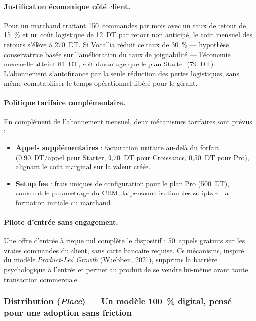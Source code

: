 \paragraph{Justification économique côté client.}
Pour un marchand traitant 150~commandes par mois avec un taux de retour de 15~\%
et un coût logistique de 12~DT par retour non anticipé, le coût mensuel
des retours s'élève à 270~DT. Si Vocallia réduit ce taux de 30~\% --- hypothèse
conservatrice basée sur l'amélioration du taux de joignabilité --- l'économie
mensuelle atteint 81~DT, soit davantage que le plan Starter (79~DT). L'abonnement
s'autofinance par la seule réduction des pertes logistiques, sans même comptabiliser
le temps opérationnel libéré pour le gérant.

\paragraph{Politique tarifaire complémentaire.}
En complément de l'abonnement mensuel, deux mécanismes tarifaires sont prévus :
\begin{itemize}
    \item \textbf{Appels supplémentaires} : facturation unitaire au-delà du
    forfait (0,90~DT/appel pour Starter, 0,70~DT pour Croissance, 0,50~DT pour
    Pro), alignant le coût marginal sur la valeur créée.
    \item \textbf{Setup fee} : frais uniques de configuration pour le plan Pro
    (500~DT), couvrant le paramétrage du CRM, la personnalisation des scripts et
    la formation initiale du marchand.
\end{itemize}

\paragraph{Pilote d'entrée sans engagement.}
Une offre d'entrée à risque nul complète le dispositif : 50~appels gratuits sur les vraies
commandes du client, sans carte bancaire requise. Ce mécanisme, inspiré du
modèle \textit{Product-Led Growth} (Wuebben, 2021), supprime la barrière
psychologique à l'entrée et permet au produit de se vendre lui-même avant
toute transaction commerciale.

\subsubsection{Distribution (\textit{Place}) --- Un modèle 100~\% digital,
pensé pour une adoption sans friction}

